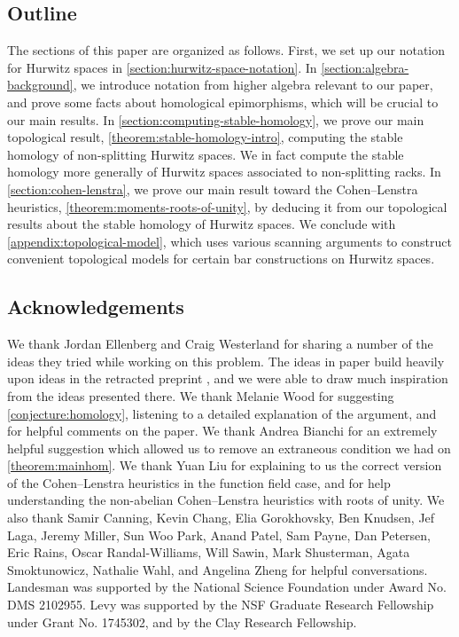 \documentclass[12 pt]{amsart}
\theoremstyle{plain}
\theoremstyle{definition}
\theoremstyle{remark}
\numberwithin{equation}{section}
\begin{document}
\subsection{Outline}
The sections of this paper are organized as follows.
First, we set up our notation for Hurwitz spaces in
\autoref{section:hurwitz-space-notation}.
In \autoref{section:algebra-background}, we introduce notation from higher
algebra relevant to our paper, and prove some facts about homological
epimorphisms, which will be crucial to our main results.
In \autoref{section:computing-stable-homology}, we prove our main topological result,
\autoref{theorem:stable-homology-intro},
computing the stable homology of non-splitting Hurwitz spaces. We in fact
compute the stable homology more generally of Hurwitz spaces associated to
non-splitting racks.
In \autoref{section:cohen-lenstra}, we prove our main result
toward the Cohen--Lenstra heuristics,
\autoref{theorem:moments-roots-of-unity},
by deducing it from our topological
results about the stable homology of Hurwitz spaces.
We conclude with \autoref{appendix:topological-model},
which uses various scanning arguments to construct convenient topological models for certain bar constructions on Hurwitz spaces.

\subsection{Acknowledgements}

We thank Jordan Ellenberg and Craig Westerland for sharing a number of
the ideas they tried while working on this problem.
The ideas in paper build heavily upon ideas in the retracted
preprint
\cite{ellenbergVWhomologicalII}, and we were able to draw much inspiration from
the ideas presented there.
We thank Melanie Wood for 
suggesting \autoref{conjecture:homology}, listening to a detailed explanation of
the argument, and for helpful comments on the paper.
We thank Andrea Bianchi for an extremely helpful suggestion which allowed us to
remove an extraneous condition we had on \autoref{theorem:mainhom}.
We thank Yuan Liu for explaining to us the correct version of the Cohen--Lenstra
heuristics in the function field case, and for help understanding the
non-abelian Cohen--Lenstra heuristics with roots of unity.
We also thank 
Samir Canning,
Kevin Chang, 
Elia Gorokhovsky,
Ben Knudsen, 
Jef Laga,
Jeremy Miller,
Sun Woo Park,
Anand Patel, 
Sam Payne,
Dan Petersen,
Eric Rains,
Oscar Randal-Williams,
Will Sawin,
Mark Shusterman,
Agata Smoktunowicz,
Nathalie Wahl,
and Angelina Zheng
for helpful conversations.
Landesman 
was supported by the National Science
Foundation 
under Award No.
DMS 2102955.
Levy was supported by the NSF Graduate Research
Fellowship under Grant No. 1745302, and by the Clay Research Fellowship.
\end{document}
